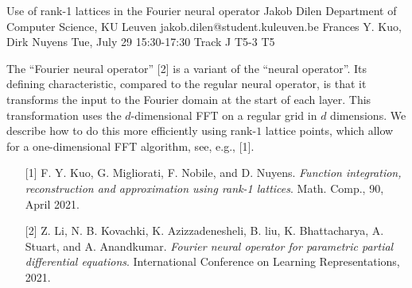 \begin{talk}
  {Use of rank-1 lattices in the Fourier neural operator}%
  {Jakob Dilen}%
  {Department of Computer Science, KU Leuven}%
  {jakob.dilen@student.kuleuven.be}%
  {Frances Y. Kuo, Dirk Nuyens}%
  {}%
  {Tue, July 29 15:30-17:30 Track J}%
  {T5-3}%
  {T5}%

The ``Fourier neural operator'' [2] is a variant of the ``neural operator''.
Its defining characteristic, compared to the regular neural operator, is that it transforms the input to the Fourier domain at the start of each layer. This transformation uses the $d$-dimensional FFT on a regular grid in $d$ dimensions. We describe how to do this more efficiently using rank-$1$ lattice points, which allow for a one-dimensional FFT algorithm, see, e.g., [1]. 

\medskip
\begin{enumerate}
        \item[{[1]}] F. Y. Kuo, G. Migliorati, F. Nobile, and D. Nuyens. \textit{Function integration,
reconstruction and approximation using rank-1 lattices}. Math. Comp., 90, April
2021.   
        \item[{[2]}] Z. Li, N. B. Kovachki, K. Azizzadenesheli, B. liu, K. Bhattacharya, A. Stuart,
and A. Anandkumar. \textit{Fourier neural operator for parametric partial differential
equations}. International Conference on Learning Representations, 2021.
\end{enumerate}
\end{talk}
